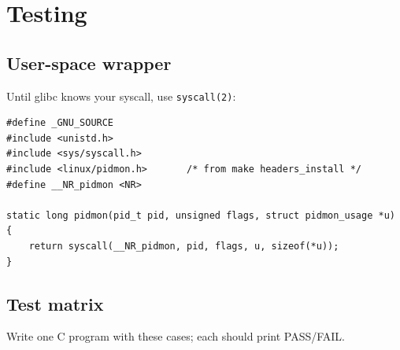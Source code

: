\documentclass[11pt,a4paper]{article}
\begin{document}
\section{Testing}
\subsection{User-space wrapper}
Until glibc knows your syscall, use \texttt{syscall(2)}:
\begin{lstlisting}
#define _GNU_SOURCE
#include <unistd.h>
#include <sys/syscall.h>
#include <linux/pidmon.h>		/* from make headers_install */
#define __NR_pidmon <NR>

static long pidmon(pid_t pid, unsigned flags, struct pidmon_usage *u)
{
	return syscall(__NR_pidmon, pid, flags, u, sizeof(*u));
}
\end{lstlisting}

\subsection{Test matrix}
Write one C program with these cases; each should print PASS/FAIL.
\end{document}
